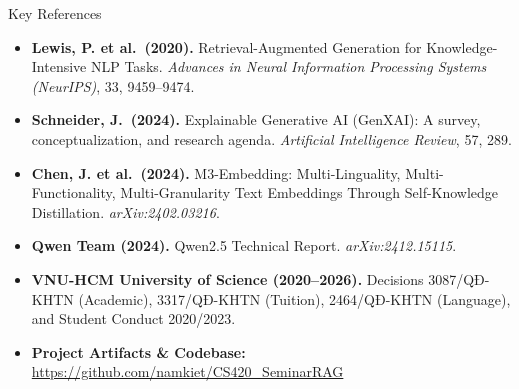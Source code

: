 \begin{frame}{Key References}
  \vspace{-0.1cm}
  \begin{itemize}
    \footnotesize
    \setlength{\itemsep}{0.2cm}
    \item \textbf{Lewis, P. et al.\ (2020).} Retrieval-Augmented Generation for Knowledge-Intensive NLP Tasks. \emph{Advances in Neural Information Processing Systems (NeurIPS)}, 33, 9459--9474.
    \item \textbf{Schneider, J.\ (2024).} Explainable Generative AI (GenXAI): A survey, conceptualization, and research agenda. \emph{Artificial Intelligence Review}, 57, 289.
    \item \textbf{Chen, J. et al.\ (2024).} M3-Embedding: Multi-Linguality, Multi-Functionality, Multi-Granularity Text Embeddings Through Self-Knowledge Distillation. \emph{arXiv:2402.03216}.
    \item \textbf{Qwen Team (2024).} Qwen2.5 Technical Report. \emph{arXiv:2412.15115}.
    \item \textbf{VNU-HCM University of Science (2020--2026).} Decisions 3087/QĐ-KHTN (Academic), 3317/QĐ-KHTN (Tuition), 2464/QĐ-KHTN (Language), and Student Conduct 2020/2023.
    \item \textbf{Project Artifacts \& Codebase:} \url{https://github.com/namkiet/CS420_SeminarRAG}
  \end{itemize}

\end{frame}
